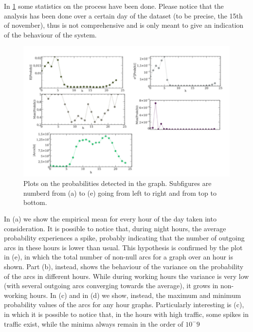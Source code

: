 In \ref{fig:analysis} some statistics on the process have been done. Please notice that the analysis has been done over 
a certain day of the dataset (to be precise, the 15th of november), thus is not comprehensive and is only meant to give 
an indication of the behaviour of the system.
\begin{figure}
\centering
\includegraphics[scale=0.7]{arcsanalysis.png}
\caption{\label{fig:analysis}Plots on the probabilities detected in the graph. Subfigures are numberd from (a) to (e) going from left to right and from top to bottom.}
\end{figure}

In (a) we show the empirical mean for every hour of the day taken into consideration. It is possible to notice that, during
night hours, the average probability experiences a spike, probably indicating that the number of outgoing arcs in these 
hours is lower than usual. This hypothesis is confirmed by the plot in (e), in which the total number of non-null arcs
for a graph over an hour is shown.
Part (b), instead, shows the behaviour of the variance on the probability of the arcs in different hours. While during
working hours the variance is very low (with several outgoing arcs converging towards the average), it grows
in non-working hours.
In (c) and in (d) we show, instead, the maximum and minimum probability values of the arcs for any hour graphs. Particularly interesting
is (c), in which it is possible to notice that, in the hours with high traffic, some spikes in traffic exist, while
the minima always remain in the order of $10^-9$ 
